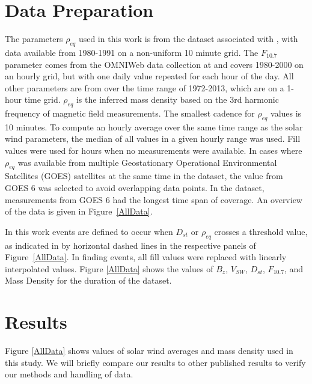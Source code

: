 \documentclass[10pt,twocolumn]{article}
\begin{document}
\section{Data Preparation}
The parameters $\rho_{eq}$ used in this work is from the dataset associated with \cite{Denton}, with data available from 1980-1991 on a non-uniform 10 minute grid. The $F_{10.7}$ parameter comes from the OMNIWeb data collection at \cite{OMNIWeb} and covers 1980-2000 on an hourly grid, but with one daily value repeated for each hour of the day. All other parameters are from \cite{Reconstruction} over the time range of 1972-2013, which are on a 1-hour time grid. $\rho_{eq}$ is the inferred mass density based on the 3rd harmonic frequency of magnetic field measurements.  The smallest cadence for $\rho_{eq}$ values is 10 minutes.  To compute an hourly average over the same time range as the solar wind parameters, the median of all values in a given hourly range was used.  Fill values were used for hours when no measurements were available.  In cases where $\rho_{eq}$ was available from multiple Geostationary Operational Environmental Satellites (GOES) satellites at the same time in the \cite{Denton} dataset, the value from GOES 6 was selected to avoid overlapping data points.  In the dataset, measurements from GOES 6 had the longest time span of coverage.  An overview of the data is given in Figure~\ref{AllData}.


In this work events are defined to occur when $D_{st}$ or $\rho_{eq}$ crosses a threshold value, as indicated in by horizontal dashed lines in the respective panels of Figure~\ref{AllData}.  In finding events, all fill values were replaced with linearly interpolated values.  Figure \ref{AllData} shows the values of $B_z$, $V_{SW}$, $D_{st}$, $F_{10.7}$, and Mass Density for the duration of the dataset. 


\section{Results}
Figure \ref{AllData} shows values of solar wind averages and mass density used in this study. We will briefly compare our results to other published results to verify our methods and handling of data. 
\end{document}
